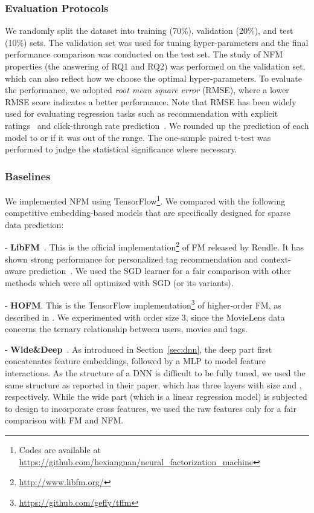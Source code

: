 \subsubsection{\textbf{Evaluation Protocols}} We randomly split the dataset into training (70\%), validation (20\%), and test (10\%) sets. The validation set was used for tuning hyper-parameters and the final performance comparison was conducted on the test set.
The study of NFM properties (\ie the answering of RQ1 and RQ2) was performed on the validation set, which can also reflect how we choose the optimal hyper-parameters. 
To evaluate the performance, we adopted \textit{root mean square error} (RMSE), where a lower RMSE score indicates a better performance. 
Note that RMSE has been widely used for evaluating regression tasks such as recommendation with explicit ratings~\cite{cao2017tois,fastFM} and click-through rate prediction~\cite{ImportanceFM}. 
We rounded up the prediction of each model to  or  if it was out of the range. The one-sample paired t-test was performed to judge the statistical significance where necessary. 

\subsubsection{\textbf{Baselines}} 
We implemented NFM using TensorFlow\footnote{Codes are available at  \url{https://github.com/hexiangnan/neural_factorization_machine}}. We compared with the following competitive embedding-based models that are specifically designed for sparse data prediction:

- \textbf{LibFM}~\cite{libFM}. This is the official implementation\footnote{\url{http://www.libfm.org/}} of FM released by Rendle. It has shown strong performance for personalized tag recommendation and context-aware prediction~\cite{fastFM}. We used the SGD learner for a fair comparison with other methods which were all optimized with SGD (or its variants). 

- \textbf{HOFM}. This is the TensorFlow implementation\footnote{\url{https://github.com/geffy/tffm}} of higher-order FM, as described in \cite{FM}. We experimented with order size 3, since the MovieLens data concerns the ternary relationship between users, movies and tags.


- \textbf{Wide\&Deep}~\cite{WideDeep}. As introduced in Section~\ref{sec:dnn}, the deep part first concatenates feature embeddings, followed by a MLP to model feature interactions. As the structure of a DNN is difficult to be fully tuned, we used the same structure as reported in their paper, which has three layers with size  and , respectively. While the wide part (which is a linear regression model) is subjected to design to incorporate cross features, 
we used the raw features only for a fair comparison with FM and NFM. 

